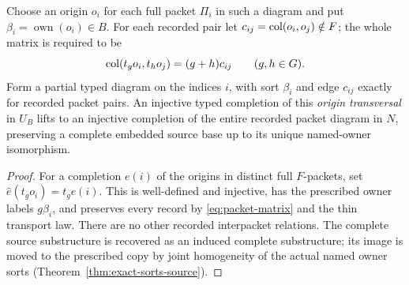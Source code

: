 \begin{lemma}
\label{lem:packet-origins}
Choose an origin $o_i$ for each full packet $\Pi_i$ in such a
diagram and put $\beta_i=\operatorname{own}(o_i)\in B$.  For each
recorded pair let $c_{ij}=\operatorname{col}(o_i,o_j)\notin F$; the whole
matrix is required to be
\begin{equation}\label{eq:packet-matrix}
 \operatorname{col}(t_g o_i,t_h o_j)=(g+h)c_{ij}\qquad(g,h\in G).
\end{equation}
Form a partial typed diagram on the indices $i$, with sort
$\beta_i$ and edge $c_{ij}$ exactly for recorded packet pairs.
An injective typed completion of this \emph{origin transversal}
in $U_B$ lifts to an injective completion of the entire recorded
packet diagram in $N$, preserving a complete embedded source base
up to its unique named-owner isomorphism.
\end{lemma}
\begin{proof}
For a completion $e(i)$ of the origins in distinct full
$F$-packets, set
$\widehat e(t_g o_i)=t_g e(i)$.  This is well-defined and
injective, has the prescribed owner labels
$g\beta_i$, and preserves every record by
\eqref{eq:packet-matrix} and the thin transport law.
There are no other recorded interpacket relations.  The complete
source substructure is recovered as an induced complete
substructure; its image is moved to the prescribed copy by joint
homogeneity of the actual named owner sorts
(Theorem~\ref{thm:exact-sorts-source}).
\end{proof}

